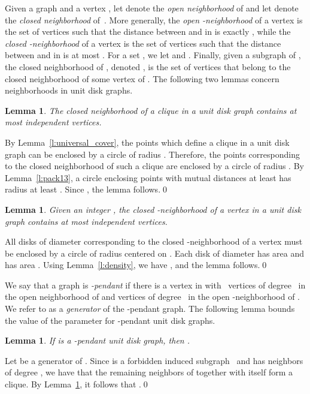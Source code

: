 \documentclass[preprint,12pt]{elsarticle}
\newtheorem{lem}[thm]{Lemma}
\begin{document}
Given a graph  and a vertex , let  denote the \emph{open neighborhood} of  and let  denote the \emph{closed neighborhood} of~. More generally, the \emph{open -neighborhood} of a vertex  is the set of vertices  such that the distance between  and  in  is exactly , while the \emph{closed -neighborhood} of a vertex  is the set of vertices  such that the distance between  and  in  is at most . For a set , we let  and . Finally, given a subgraph  of , the closed neighborhood of , denoted , is the set of vertices that belong to the closed neighborhood of some vertex of . The following two lemmas concern neighborhoods in unit disk graphs.
\begin{lem} \label{l:clique}
The closed neighborhood of a clique in a unit disk graph contains at most  independent vertices.
\end{lem}
\begin{pf}
By Lemma~\ref{l:universal_cover}, the points which define a clique in a unit disk graph can be enclosed by a circle of radius . Therefore, the points corresponding to the closed neighborhood of such a clique are enclosed by a circle of radius . By Lemma~\ref{l:pack13},
a circle enclosing  points with mutual distances at least  has radius at least . Since , the lemma follows.\qed \end{pf}
\begin{lem} \label{l:2neighborhood}
Given an integer , the closed -neighborhood of a vertex in a unit disk graph contains at most  independent vertices.
\end{lem}
\begin{pf}
All  disks of diameter  corresponding to the closed -neighborhood of a vertex  must be enclosed by a circle  of radius  centered on . Each disk of diameter  has area  and  has area . Using Lemma~\ref{l:density}, we have , and the lemma follows.\qed
\end{pf}

We say that a graph  is \emph{-pendant} if there is a vertex  in  with ~vertices of degree~ in the open neighborhood of  and  vertices of degree~ in the open -neighborhood of . We refer to  as a \emph{generator} of the -pendant graph. The following lemma bounds the value of the parameter  for -pendant unit disk graphs.

\begin{lem} \label{l:4l-pendant}
If  is a -pendant unit disk graph, then .
\end{lem}
\begin{pf}
Let  be a generator of . Since  is a forbidden induced subgraph~\cite{heuristics} and  has  neighbors of degree , we have that the remaining neighbors of  together with  itself form a clique. By Lemma~\ref{l:clique}, it follows that .\qed
\end{pf}
\end{document}
